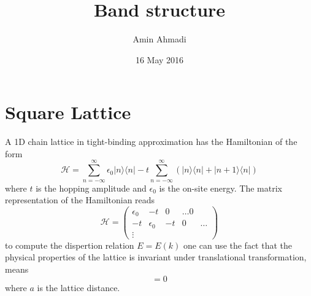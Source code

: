 \documentclass[11pt]{article}
\author{Amin Ahmadi}
\date{16 May 2016}
\title{Band structure}
\newcommand{\hl}{\mathcal{H}}
\newcommand{\rg}{\rangle}
\newcommand{\leg}{\langle}
\newcommand{\ep}{\epsilon}
\begin{document}
\section{Square Lattice}
A 1D chain lattice in tight-binding approximation has the
Hamiltonian of the form
\begin{equation}
  \hl = \sum_{n=-\infty}^{\infty} \epsilon_0 |n\rg\leg n|
  -t\sum_{n=-\infty}^\infty (|n\rg\leg n| + |n+1\rg\leg n|)
\end{equation}
where $t$ is the hopping amplitude and $\ep_0$ is the
on-site energy. The matrix representation of the Hamiltonian
reads
\begin{equation}
  \hl =
  \begin{pmatrix}
    \ep_0 & -t & 0 & \ldots 0 \\
    -t & \ep_0 & -t & 0 & \ldots \\
    \vdots
  \end{pmatrix}
\end{equation}
to compute the dispertion relation $E=E(k)$ one can use the
fact that the physical properties of the lattice is
invariant under translational transformation, means
\begin{equation}
  [\hl,\tau(a)] = 0
\end{equation}
where $a$ is the lattice distance.
\end{document}
